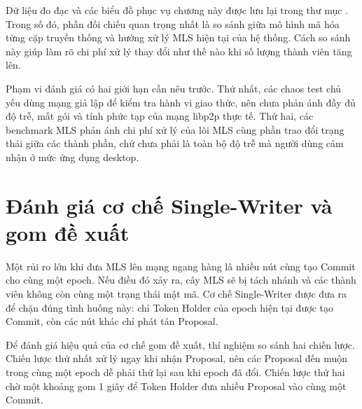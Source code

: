 \documentclass[../DoAn.tex]{subfiles}
\begin{document}
Dữ liệu đo đạc và các biểu đồ phục vụ chương này được lưu lại trong thư mục . Trong số đó, phần đối chiếu quan trọng nhất là so sánh giữa mô hình mã hóa từng cặp truyền thống và hướng xử lý MLS hiện tại của hệ thống. Cách so sánh này giúp làm rõ chi phí xử lý thay đổi như thế nào khi số lượng thành viên tăng lên.
	
Phạm vi đánh giá có hai giới hạn cần nêu trước. Thứ nhất, các chaos test chủ yếu dùng mạng giả lập để kiểm tra hành vi giao thức, nên chưa phản ánh đầy đủ độ trễ, mất gói và tính phức tạp của mạng libp2p thực tế. Thứ hai, các benchmark MLS phản ánh chi phí xử lý của lõi MLS cùng phần trao đổi trạng thái giữa các thành phần, chứ chưa phải là toàn bộ độ trễ mà người dùng cảm nhận ở mức ứng dụng desktop.

	\section{Đánh giá cơ chế Single-Writer và gom đề xuất}
	\label{sec:danh_gia_single_writer}
	
Một rủi ro lớn khi đưa MLS lên mạng ngang hàng là nhiều nút cùng tạo Commit cho cùng một epoch. Nếu điều đó xảy ra, cây MLS sẽ bị tách nhánh và các thành viên không còn cùng một trạng thái mật mã. Cơ chế Single-Writer được đưa ra để chặn đúng tình huống này: chỉ Token Holder của epoch hiện tại được tạo Commit, còn các nút khác chỉ phát tán Proposal.
	
Để đánh giá hiệu quả của cơ chế gom đề xuất, thí nghiệm so sánh hai chiến lược. Chiến lược thứ nhất xử lý ngay khi nhận Proposal, nên các Proposal đến muộn trong cùng một epoch dễ phải thử lại sau khi epoch đã đổi. Chiến lược thứ hai chờ một khoảng gom 1 giây để Token Holder đưa nhiều Proposal vào cùng một Commit.
	
	\begin{table}[htbp]
		\centering
		\caption{So sánh xử lý ngay và cơ chế gom đề xuất}
		\label{tab:concurrency_results}
	\end{table}
	
\end{document}
